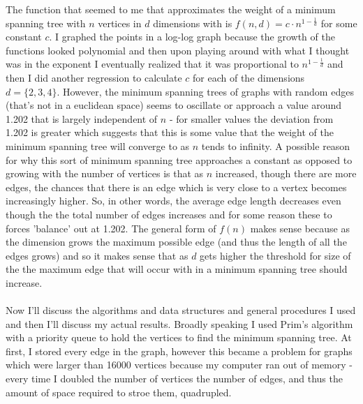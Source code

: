 \documentclass{article}
\begin{document}
The function that seemed to me that approximates the weight of a minimum spanning tree with $n$ vertices in $d$ dimensions with is $f(n,d) = c\cdot n^{1 - \frac{1}{d}}$ for some constant $c$.  I graphed the points in a log-log graph because the growth of the functions looked polynomial and then upon playing around with what I thought was in the exponent I eventually realized that it was proportional to $n^{1-\frac{1}{d}}$ and then I did another regression to calculate $c$ for each of the dimensions $d = \{2,3,4\}$.  However, the minimum spanning trees of graphs with random edges (that's not in a euclidean space)  seems to oscillate or approach a value around 1.202 that is largely independent of $n$ - for smaller values the deviation from 1.202 is greater which suggests that this is some value that the weight of the minimum spanning tree will converge to as $n$ tends to infinity.  A possible reason for why this sort of minimum spanning tree approaches a constant as opposed to growing with the number of vertices is that as $n$ increased, though there are more edges, the chances that there is an edge which is very close to a vertex becomes increasingly higher.  So, in other words, the average edge length decreases even though the the total number of edges increases and for some reason these to forces 'balance' out at 1.202.  The general form of $f(n)$ makes sense because as the dimension grows the maximum possible edge (and thus the length of all the edges grows) and so it makes sense that as $d$ gets higher the threshold for size of the the maximum edge that will occur with in a minimum spanning tree should increase. \\\\

Now I'll discuss the algorithms and data structures and general procedures I used and then I'll discuss my actual results.  Broadly speaking I used Prim's algorithm with a priority queue to hold the vertices to find the minimum spanning tree.  At first, I stored every edge in the graph, however this became a problem for graphs which were larger than 16000 vertices because my computer ran out of memory - every time I doubled the number of vertices the number of edges, and thus the amount of space required to stroe them, quadrupled.  \\\\
\end{document}
